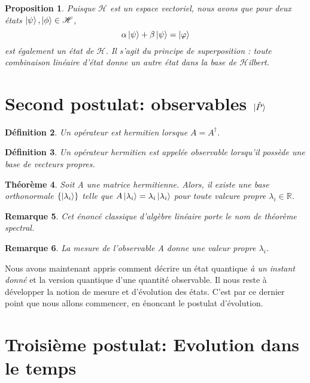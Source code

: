 \documentclass{report}
\numberwithin{equation}{part}
\newtheorem{theorem}{Théorème}[section]
\newtheorem{definition}[theorem]{Définition}
\newtheorem{Property}[theorem]{Proposition}
\newtheorem{remark}[theorem]{Remarque}
\begin{document}
\begin{Property}
    Puisque $\mathcal{H}$ est un espace vectoriel, nous avons que pour deux états $\ket{\psi},\ket{\phi} \in\mathcal{H}$, 
    \begin{equation}
        \alpha\ket{\psi}+\beta\ket{\psi}=\ket{\varphi}
    \end{equation}
    est également un état de $\mathcal{H}$. Il s'agit du principe de superposition : toute combinaison linéaire d'état donne un autre état dans la base de $\mathcal{H}$ilbert.
    \label{Superposition}
\end{Property}

\section{Second postulat: observables $\ket{\hat{P}}$}

\begin{definition}
    Un opérateur est hermitien lorsque $A=A^\dagger$.
\end{definition}

\begin{definition}
    Un opérateur hermitien est appelée observable lorsqu'il possède une base de vecteurs propres.
\end{definition}

\begin{theorem}
    Soit A une matrice hermitienne. Alors, il existe une base orthonormale $\{\ket{\lambda_i}\}$ telle que $A\ket{\lambda_i}=\lambda_i\ket{\lambda_i}$ pour toute valeure propre $\lambda_i\in\mathbb{R}$.
\end{theorem}

\begin{remark}
    Cet énoncé classique d'algèbre linéaire porte le nom de théorème spectral.
\end{remark}

\begin{remark}
    La mesure de l'observable A donne une valeur propre $\lambda_i$.
\end{remark}

Nous avons maintenant appris comment décrire un état quantique \textit{à un instant donné} et la version quantique d'une quantité observable. Il nous reste à développer la notion de mesure et d'évolution des états. C'est par ce dernier point que nous allons commencer, en énoncant le postulat d'évolution.

\section{Troisième postulat: Evolution dans le temps}
\end{document}
